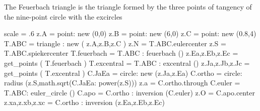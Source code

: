 \documentclass{article}
\begin{document}
 

 The Feuerbach triangle is the triangle formed by the three points of tangency of the nine-point circle with the excircles    

\begin{tkzelements}
  scale           = .6
  z.A             = point: new (0,0)
  z.B             = point: new (6,0)
  z.C             = point: new (0.8,4)
  T.ABC           = triangle : new ( z.A,z.B,z.C )
  z.N             = T.ABC.eulercenter
  z.S             = T.ABC.spiekercenter
  T.feuerbach     = T.ABC : feuerbach ()
  z.Ea,z.Eb,z.Ec  = get_points ( T.feuerbach )
  T.excentral     = T.ABC : excentral ()
  z.Ja,z.Jb,z.Jc  = get_points ( T.excentral )
  C.JaEa          = circle: new (z.Ja,z.Ea)
  C.ortho         = circle: radius (z.S,math.sqrt(C.JaEa: power(z.S)))
  z.a             = C.ortho.through
  C.euler         = T.ABC: euler_circle ()
  C.apo           = C.ortho : inversion (C.euler)
  z.O             = C.apo.center
  z.xa,z.xb,z.xc  = C.ortho : inversion (z.Ea,z.Eb,z.Ec)
\end{tkzelements}

\vspace*{2em}
\hfill
{}
\hfill
\end{document}
